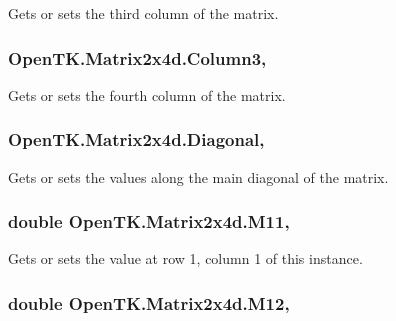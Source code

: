Gets or sets the third column of the matrix. 

\hypertarget{struct_open_t_k_1_1_matrix2x4d_a87200a84b40816d6d53a2414ef4644c4}{
\subsubsection[{Column3}]{ Open\-T\-K.\-Matrix2x4d.\-Column3\hspace{0.3cm}{\ttfamily [get]}, {\ttfamily [set]}}}\label{struct_open_t_k_1_1_matrix2x4d_a87200a84b40816d6d53a2414ef4644c4}


Gets or sets the fourth column of the matrix. 

\hypertarget{struct_open_t_k_1_1_matrix2x4d_a6af45195f3072eb873dc29721fdc1075}{
\subsubsection[{Diagonal}]{ Open\-T\-K.\-Matrix2x4d.\-Diagonal\hspace{0.3cm}{\ttfamily [get]}, {\ttfamily [set]}}}\label{struct_open_t_k_1_1_matrix2x4d_a6af45195f3072eb873dc29721fdc1075}


Gets or sets the values along the main diagonal of the matrix. 

\hypertarget{struct_open_t_k_1_1_matrix2x4d_a842d3ccd934f5b1e45fd03bde8a1766c}{
\subsubsection[{M11}]{\setlength{\rightskip}{0pt plus 5cm}double Open\-T\-K.\-Matrix2x4d.\-M11\hspace{0.3cm}{\ttfamily [get]}, {\ttfamily [set]}}}\label{struct_open_t_k_1_1_matrix2x4d_a842d3ccd934f5b1e45fd03bde8a1766c}


Gets or sets the value at row 1, column 1 of this instance. 

\hypertarget{struct_open_t_k_1_1_matrix2x4d_a1741aebdbf36dd902d6b716844130980}{
\subsubsection[{M12}]{\setlength{\rightskip}{0pt plus 5cm}double Open\-T\-K.\-Matrix2x4d.\-M12\hspace{0.3cm}{\ttfamily [get]}, {\ttfamily [set]}}}\label{struct_open_t_k_1_1_matrix2x4d_a1741aebdbf36dd902d6b716844130980}



